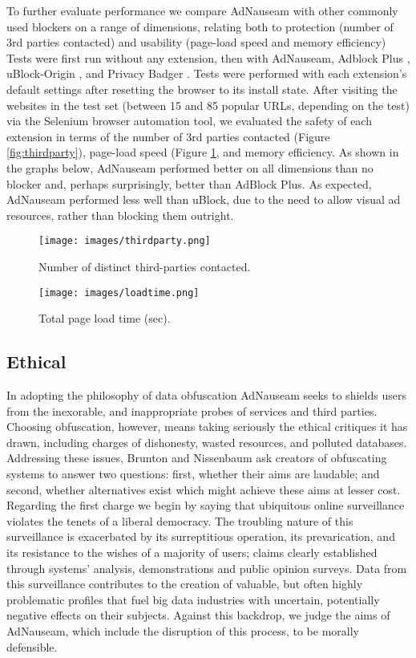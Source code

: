 \documentclass[conference]{IEEEtran}
\begin{document}
To further evaluate performance we compare AdNauseam with other commonly used blockers on a range of dimensions, relating both to protection (number of 3rd parties contacted) and usability (page-load speed and memory efficiency) Tests were first run without any extension, then with AdNauseam, Adblock Plus \cite{AdBlock}, uBlock-Origin \cite{Gorhill}, and Privacy Badger \cite{EFF-0}. Tests were performed with each extension's default settings after resetting the browser to its install state. After visiting the websites in the test set (between 15 and 85 popular URLs, depending on the test) via the Selenium browser automation tool, we evaluated the safety of each extension in terms of the number of 3rd parties contacted (Figure \ref{fig:thirdparty}), page-load speed (Figure \ref{fig:loadtime}, and memory efficiency. As shown in the graphs below, AdNauseam performed better on all dimensions than no blocker and, perhaps surprisingly, better than AdBlock Plus. As expected, AdNauseam performed less well than uBlock, due to the need to allow visual ad resources, rather than blocking them outright.

\begin{figure}[!t]
\centering
\texttt{[image: images/thirdparty.png]}
\caption{Number of distinct third-parties contacted.}
\label{fig:thirdparty}
\vspace{2mm}
\texttt{[image: images/loadtime.png]}
\caption{Total page load time (sec).}
\label{fig:loadtime}
\end{figure}


\subsection{Ethical}

In adopting the philosophy of data obfuscation AdNauseam seeks to shields users from the inexorable, and inappropriate probes of services and third parties. Choosing obfuscation, however, means taking seriously the ethical critiques it has drawn, including charges of dishonesty, wasted resources, and polluted databases. Addressing these issues, Brunton and Nissenbaum\cite{Brunton} ask creators of obfuscating systems to answer two questions: first, whether their aims are laudable; and second, whether alternatives exist which might achieve these aims at lesser cost. Regarding the first charge we begin by saying that ubiquitous online surveillance violates the tenets of a liberal democracy. The troubling nature of this surveillance is exacerbated by its surreptitious operation, its prevarication, and its resistance to the wishes of a majority of users; claims clearly established through systems' analysis, demonstrations and public opinion surveys\cite{Turow, Goldfarb, Tucker}. Data from this surveillance contributes to the creation of valuable, but often highly problematic profiles that fuel big data industries with uncertain, potentially negative effects on their subjects. Against this backdrop, we judge the aims of AdNauseam, which include the disruption of this process, to be morally defensible.
\end{document}
